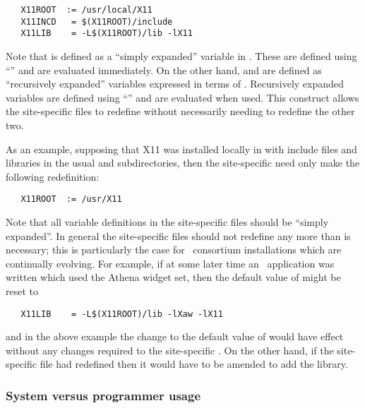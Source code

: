 \begin{verbatim}
   X11ROOT  := /usr/local/X11
   X11INCD   = $(X11ROOT)/include
   X11LIB    = -L$(X11ROOT)/lib -lX11
\end{verbatim}

\noindent
Note that  is defined as a ``simply expanded'' variable in \gnu
{}.  These are defined using ``\code{:=}'' and are evaluated
immediately.  On the other hand,  and  are defined
as ``recursively expanded'' variables expressed in terms of .
Recursively expanded variables are defined using ``\code{=}'' and are
evaluated when used.  This construct allows the site-specific 
files to redefine  without necessarily needing to redefine the
other two.

As an example, supposing that \textsc{X11} was installed locally in
 with include files and libraries in the usual 
and  subdirectories, then the site-specific  need
only make the following redefinition:

\begin{verbatim}
   X11ROOT  := /usr/X11
\end{verbatim}

\noindent
Note that all variable definitions in the site-specific  files
should be ``simply expanded''.  In general the site-specific files should not
redefine any more than is necessary; this is particularly the case for
\aipspp\ consortium installations which are continually evolving.  For
example, if at some later time an \aipspp\ application was written which
used the Athena widget set, then the default value of  might be
reset to

\begin{verbatim}
   X11LIB    = -L$(X11ROOT)/lib -lXaw -lX11
\end{verbatim}

\noindent
and in the above example the change to the default value of 
would have effect without any changes required to the site-specific
.  On the other hand, if the site-specific  file
had redefined  then it would have to be amended to add the
 library.

\subsubsection*{System versus programmer usage}

